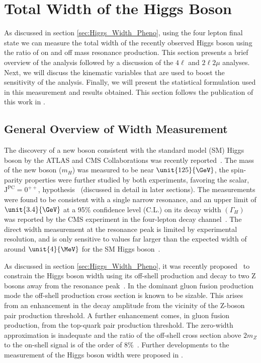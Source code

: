 \chapter{Total Width of the Higgs Boson}
\label{sec:Width_Experiment}

As discussed in section \ref{sec:Higgs_Width_Pheno}, using the four lepton final state we can measure the total width of the recently observed Higgs boson using the ratio of on and off mass resonance production. This section presents a brief overview of the analysis followed by a discussion of the $4\ell$ and $2\ell2\mu$ analyses. Next, we will discuss the kinematic variables that are used to boost the sensitivity of the analysis. Finally, we will present the statistical formulation used in this measurement and results obtained. This section follows the publication of this work in \cite{Khachatryan:2014iha}.

\section{General Overview of Width Measurement}
\label{sec:General_H_ZZ_Width}

The discovery of a new boson consistent with the standard model (SM) Higgs boson by the ATLAS and CMS Collaborations was recently reported~\cite{Aad:2012tfa, Chatrchyan:2012ufa, Chatrchyan:2013lba}. The mass of the new boson ($m_{H}$) was measured to be near $\unit{125}{\GeV}$, the spin-parity properties were further studied by both experiments, favoring the scalar, $\mathrm{J}^{\mathrm{PC}} = 0^{++}$, hypothesis~\cite{Chatrchyan:2012jja,Aad:2013wqa,Aad:2013xqa,Chatrchyan:2013mxa} (discussed in detail in later sections). The measurements were found to be consistent with a single narrow resonance, and an upper limit of $\unit{3.4}{\GeV}$ at a 95\% confidence level (C.L.) on its decay width $\left(\Gamma_{H}\right)$ was reported by the CMS experiment in the four-lepton decay channel~\cite{Chatrchyan:2013mxa}. The direct width measurement at the resonance peak is limited by experimental resolution, and is only sensitive to values far larger than the expected width of around $\unit{4}{\MeV}$ for the SM Higgs boson~\cite{Dittmaier:2011ti,Heinemeyer:2013tqa}.

As discussed in section \ref{sec:Higgs_Width_Pheno}, it was recently proposed~\cite{Caola:2013yja} to constrain the Higgs boson width using its
off-shell production and decay to two Z bosons away from the resonance peak~\cite{Kauer:2012hd}.
In the dominant gluon fusion production mode the off-shell production cross section is known to be
sizable. This arises from an enhancement in the decay amplitude from the vicinity of the Z-boson pair production
threshold. A further enhancement comes, in gluon fusion production, from the top-quark
pair production threshold. The zero-width approximation is inadequate and the ratio of the off-shell
cross section above $2m_{Z}$ to the on-shell signal is of the order of 8\%~\cite{Kauer:2012hd,Kauer:2013cga}.
Further developments to the measurement of the Higgs boson width were proposed in \cite{Campbell:2013una,Passarino:2013bha}.


